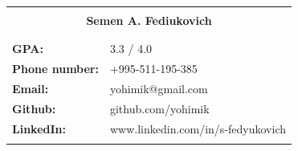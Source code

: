 \documentclass[12pt]{article}
\begin{document}
    \pagestyle{empty}

    \begin{center}
        \begin{tabular}{ll}
            \hline
            &\\
            \multicolumn{2}{c}{\textbf{Semen A. Fediukovich}}\\
            &\\
            \hline
            &\\
            \textbf{GPA:} & 3.3 / 4.0   \\
            \textbf{Phone number:} & +995-511-195-385  \\
            \textbf{Email:} & yohimik@gmail.com  \\
            \textbf{Github:} & github.com/yohimik   \\
            \textbf{LinkedIn:} & www.linkedin.com/in/s-fedyukovich   \\
            &\\
            \hline
        \end{tabular}
    \end{center}
\end{document}
